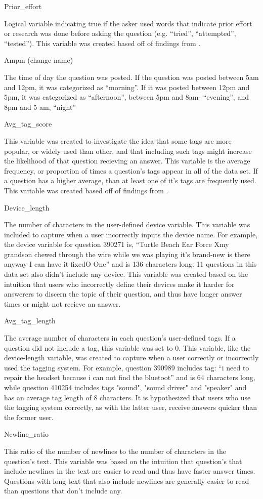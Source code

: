 \documentclass[12pt]{article}
\begin{document}
Prior\_effort 

Logical variable indicating true if the asker used words that indicate prior effort or research was done before asking the question (e.g. ``tried'', ``attempted'', ``tested''). This variable was created based off of findings from \cite{Bhat2014}. 

Ampm (change name)

The time of day the question was posted. If the question was posted between 5am and 12pm, it was categorized as ``morning''. If it was posted between 12pm and 5pm, it was categorized as ``afternoon'', between 5pm and 8am- ``evening'', and 8pm and 5 am, ``night''

Avg\_tag\_score

This variable was created to investigate the idea that some tags are more popular, or widely used than other, and that including such tags might increase the likelihood of that question recieving an answer. This variable is the average frequency, or proportion of times a question's tags appear in all of the data set. If a question has a higher average, than at least one of it's tags are frequently used. This variable was created based off of findings from \cite{Bhat2014}. 


Device\_length

The number of characters in the user-defined device variable. This variable was included to capture when a user incorrectly inputs the device name. For example, the device variable for question 390271 is, “Turtle Beach Ear Force Xmy grandson chewed through the wire while we was playing it's brand-new is there anyway I can have it fixedO One” and is 136 characters long. 11 questions in this data set also didn’t include any device. This variable was created based on the intuition that users who incorrectly define their devices make it harder for answerers to discern the topic of their question, and thus have longer answer times or might not recieve an answer.

Avg\_tag\_length

The average number of characters in each question's user-defined tags. If a question did not include a tag, this variable was set to 0. This variable, like the device-length variable, was created to capture when a user correctly or incorrectly used the tagging system. For example, question 390989 includes tag: “i need to repair the headset because i can not find the bluetoot” and is 64 characters long, while question 410254 includes tags "sound", "sound driver" and "speaker" and has an average tag length of 8 characters. It is hypothesized that users who use the tagging system correctly, as with the latter user, receive answers quicker than the former user. 

Newline\_ratio

This ratio of the number of newlines to the number of characters in the question's text. This variable was based on the intuition that question's that include newlines in the text are easier to read and thus have faster answer times. Questions with long text that also include newlines are generally easier to read than questions that don’t include any. 



\end{document}
